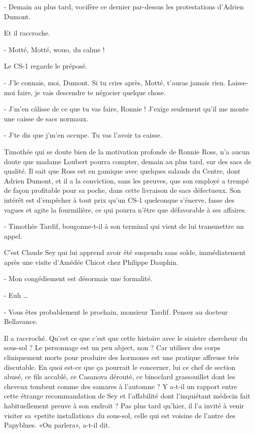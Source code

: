 - Demain au plus tard, vocifère ce dernier par-dessus les protestations d’Adrien Dumont.

Et il raccroche.

- Motté, Motté, wouo, du calme !

Le CS-1 regarde le préposé.

- J’le connais, moi, Dumont. Si tu cries après, Motté, t’auras jamais rien. Laisse-moi faire, je vais descendre te négocier quelque chose.

- J’m’en câlisse de ce que tu vas faire, Ronnie ! J’exige seulement qu’il me monte une caisse de sacs normaux.

- J’te dis que j’m’en occupe. Tu vas l’avoir ta caisse.

Timothée qui se doute bien de la motivation profonde de Ronnie Ross, n’a aucun doute que madame Loubert pourra compter, demain au plus tard, sur des sacs de qualité. Il sait que Ross est en gamique avec quelques salauds du Centre, dont Adrien Dumont, et il a la conviction, sans les preuves, que son employé a trempé de façon profitable pour sa poche, dans cette livraison de sacs défectueux. Son intérêt est d’empêcher à tout prix qu’un CS-1 quelconque s’énerve, fasse des vagues et agite la fourmilière, ce qui pourra n’être que défavorable à ses affaires.

- Timothée Tardif, bougonne-t-il à son terminal qui vient de lui transmettre un appel.

C’est Claude Sey qui lui apprend avoir été suspendu sans solde, immédiatement après une visite d’Amédée Chicot chez Philippe Dauphin.

- Mon congédiement est désormais une formalité.

- Euh …

- Vous êtes probablement le prochain, monsieur Tardif. Pensez au docteur Bellavance.

Il a raccroché. Qu’est ce que c’est que cette histoire avec le sinistre chercheur du sous-sol ? Le personnage est un peu abject, non ? Car utiliser des corps cliniquement morts pour produire des hormones est une pratique affreuse très discutable. En quoi est-ce que ça pourrait le concerner, lui ce chef de section abusé, ce fils accablé, ce Casanova dérouté, ce binoclard grassouillet dont les cheveux tombent comme des samares à l’automne ? Y a-t-il un rapport entre cette étrange recommandation de Sey et l’affabilité dont l’inquiétant médecin fait habituellement preuve à son endroit ? Pas plus tard qu’hier, il l’a invité à venir visiter sa «petite installation» du sous-sol, celle qui est voisine de l’antre des Papyblues. «On parlera», a-t-il dit.

